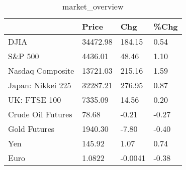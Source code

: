 \documentclass{article}%
\begin{document}
%


\begin{table}[htbp]%
\caption{market\_overview}%
\centering%
\begin{adjustbox}{width=1\textwidth}%
\begin{tabular}{llll}
\toprule
                  &    Price &     Chg &  \%Chg \\
\midrule
             DJIA & 34472.98 &  184.15 &  0.54 \\
          S\&P 500 &  4436.01 &   48.46 &  1.10 \\
 Nasdaq Composite & 13721.03 &  215.16 &  1.59 \\
Japan: Nikkei 225 & 32287.21 &  276.95 &  0.87 \\
     UK: FTSE 100 &  7335.09 &   14.56 &  0.20 \\
Crude Oil Futures &    78.68 &   -0.21 & -0.27 \\
     Gold Futures &  1940.30 &   -7.80 & -0.40 \\
              Yen &   145.92 &    1.07 &  0.74 \\
             Euro &   1.0822 & -0.0041 & -0.38 \\
\bottomrule
\end{tabular}
%
\end{adjustbox}%
\end{table}

%
\end{document}

